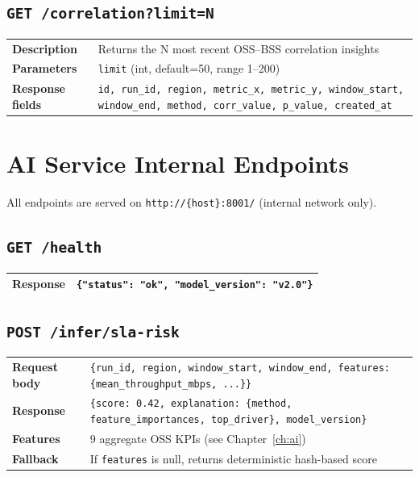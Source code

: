 \subsection{\texttt{GET /correlation?limit=N}}

\begin{tabularx}{\textwidth}{@{}lX@{}}
\toprule
\textbf{Description} & Returns the N most recent OSS--BSS correlation insights \\
\textbf{Parameters} & \texttt{limit} (int, default=50, range 1--200) \\
\textbf{Response fields} & \texttt{id, run\_id, region, metric\_x, metric\_y, window\_start, window\_end, method, corr\_value, p\_value, created\_at} \\
\bottomrule
\end{tabularx}

\section{AI Service Internal Endpoints}

All endpoints are served on \texttt{http://\{host\}:8001/} (internal network only).

\subsection{\texttt{GET /health}}

\begin{tabularx}{\textwidth}{@{}lX@{}}
\toprule
\textbf{Response} & \texttt{\{"status": "ok", "model\_version": "v2.0"\}} \\
\bottomrule
\end{tabularx}

\subsection{\texttt{POST /infer/sla-risk}}

\begin{tabularx}{\textwidth}{@{}lX@{}}
\toprule
\textbf{Request body} & \texttt{\{run\_id, region, window\_start, window\_end, features: \{mean\_throughput\_mbps, ...\}\}} \\
\textbf{Response} & \texttt{\{score: 0.42, explanation: \{method, feature\_importances, top\_driver\}, model\_version\}} \\
\textbf{Features} & 9 aggregate OSS KPIs (see Chapter~\ref{ch:ai}) \\
\textbf{Fallback} & If \texttt{features} is null, returns deterministic hash-based score \\
\bottomrule
\end{tabularx}

